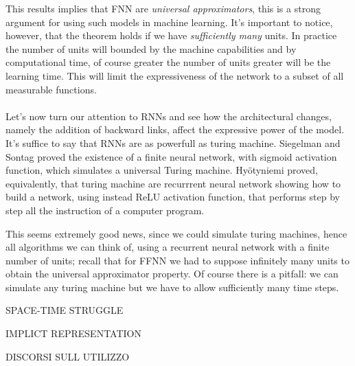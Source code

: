 This results implies that FNN are \textit{universal approximators}, this is a strong argument for using such models in machine learning.
It's important to notice, however, that the theorem holds if we have \textit{sufficiently many} units. In practice the number of units will bounded
by the machine capabilities and by computational time, of course greater the number of units greater will be the learning time. This will limit
the expressiveness of the network to a subset of all measurable functions. 
\\\\Let's now turn our attention to RNNs and see how the architectural changes, namely the addition of backward links, affect the expressive power of the model.
It's suffice to say that RNNs are as powerfull as turing machine. Siegelman and Sontag \cite{Siegelmann91turingcomputability} proved the existence 
of a finite neural network, with sigmoid activation function, which simulates a universal Turing machine. Hy{\"o}tyniemi \cite{Hyotyniemi96turingmachines} proved, equivalently,
that turing machine are recurrrent neural network showing how to build a network, using instead ReLU activation function, that performs step by step 
all the instruction of a computer program.

This seems extremely good news, since we could simulate turing machines, hence all algorithms we can think of, using a recurrent neural network with a finite
number of units; recall that for FFNN we had to suppose infinitely many units to obtain the universal approximator property.
Of course there is a pitfall: we can simulate any turing machine but we have to allow sufficiently many time steps.

SPACE-TIME STRUGGLE

IMPLICT REPRESENTATION

DISCORSI SULL UTILIZZO





